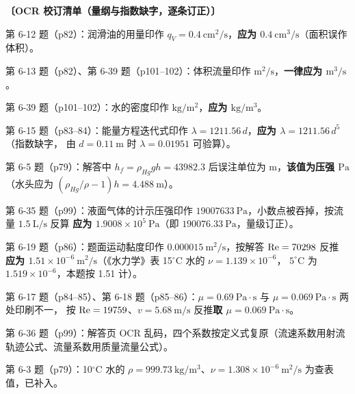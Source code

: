 \begin{tishi}
\textbf{〔OCR 校订清单（量纲与指数缺字，逐条订正）〕}
\begin{xiaowen}
\item 第 6-12 题（p82）：润滑油的用量印作 $q_V=0.4\ \mathrm{cm^2/s}$，\textbf{应为 $0.4\ \mathrm{cm^3/s}$}（面积误作体积）。
\item 第 6-13 题（p82）、第 6-39 题（p101--102）：体积流量印作 $\mathrm{m^2/s}$，\textbf{一律应为 $\mathrm{m^3/s}$}。
\item 第 6-39 题（p101--102）：水的密度印作 $\mathrm{kg/m^2}$，\textbf{应为 $\mathrm{kg/m^3}$}。
\item 第 6-15 题（p83--84）：能量方程迭代式印作 $\lambda=1211.56\,d$，\textbf{应为 $\lambda=1211.56\,d^5$}（指数缺字，
由 $d=0.11\ \mathrm{m}$ 时 $\lambda=0.01951$ 可验算）。
\item 第 6-5 题（p79）：解答中 $h_f=\rho_{Hg}gh=43982.3$ 后误注单位为 $\mathrm{m}$，\textbf{该值为压强 $\mathrm{Pa}$}
（水头应为 $(\rho_{Hg}/\rho-1)h=4.488\ \mathrm{m}$）。
\item 第 6-35 题（p99）：液面气体的计示压强印作 $19007633\ \mathrm{Pa}$，小数点被吞掉，按流量 $1.5\ \mathrm{L/s}$ 反算
\textbf{应为 $1.9008\times10^5\ \mathrm{Pa}$}（即 $190076.33\ \mathrm{Pa}$，量级订正）。
\item 第 6-19 题（p86）：题面运动黏度印作 $0.000015\ \mathrm{m^2/s}$，按解答 $\mathrm{Re}=70298$ 反推
\textbf{应为 $1.51\times10^{-6}\ \mathrm{m^2/s}$}（《水力学》表 15$^\circ$C 水的 $\nu=1.139\times10^{-6}$，
$5^\circ$C 为 $1.519\times10^{-6}$，本题按 1.51 计）。
\item 第 6-17 题（p84--85）、第 6-18 题（p85--86）：$\mu=0.69\ \mathrm{Pa\cdot s}$ 与 $\mu=0.069\ \mathrm{Pa\cdot s}$ 两处印刷不一，
按 $\mathrm{Re}=19759$、$v=5.68\ \mathrm{m/s}$ 反推\textbf{取 $\mu=0.069\ \mathrm{Pa\cdot s}$}。
\item 第 6-36 题（p99）：解答页 OCR 乱码，四个系数按定义式复原（流速系数用射流轨迹公式、流量系数用质量流量公式）。
\item 第 6-3 题（p79）：10$^\circ$C 水的 $\rho=999.73\ \mathrm{kg/m^3}$、$\nu=1.308\times10^{-6}\ \mathrm{m^2/s}$ 为查表值，已补入。
\end{xiaowen}
\end{tishi}

